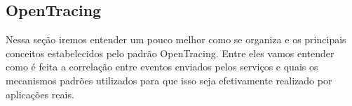 	\subsection{OpenTracing}
	
	Nessa seção iremos entender um pouco melhor como se organiza e os principais conceitos estabelecidos pelo padrão OpenTracing. Entre eles vamos entender como é feita a correlação entre eventos enviados pelos serviços e quais os mecanismos padrões utilizados para que isso seja efetivamente realizado por aplicações reais.
	
	